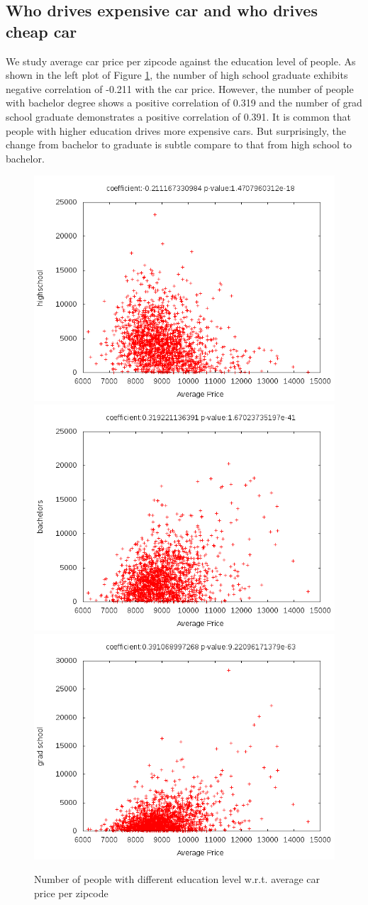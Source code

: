 \documentclass[10pt,twocolumn,letterpaper]{article}
\begin{document}
\subsection{Who drives expensive car and who drives cheap car}
We study average car price per zipcode against the education level of people. As shown in the left plot of Figure \ref{fig:pricetoedu}, the number of high school graduate exhibits negative correlation of -0.211 with the car price. However, the number of people with bachelor degree shows a positive correlation of 0.319 and the number of grad school graduate demonstrates a positive correlation of 0.391. It is common that people with higher education drives more expensive cars. But surprisingly, the change from bachelor to graduate is subtle compare to that from high school to bachelor.
\begin{figure}[t]
\begin{center}
    \includegraphics[width=0.3\linewidth]{img/averagePriceHighSchool.png}
    \includegraphics[width=0.3\linewidth]{img/averagePriceBachelor.png}
    \includegraphics[width=0.3\linewidth]{img/averagePriceGradSchool.png} 
\end{center}
   \caption {Number of people with different education level w.r.t. average car price per zipcode}
\label{fig:pricetoedu}
\end{figure}
\end{document}
